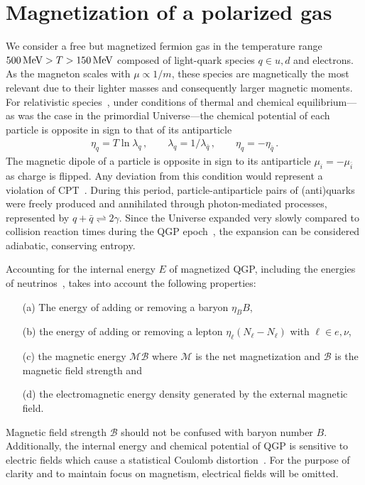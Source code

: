 \documentclass[epjST]{svjour}
\newcommand*{\MeV}{\text{\,MeV}}
\numberwithin{equation}{section}
\begin{document}
\section{Magnetization of a polarized gas}
\label{sec:magnetization}
We consider a free but magnetized fermion gas in the temperature range \(500\MeV>T>150\MeV\) composed of light-quark species \(q \in {u,d}\) and electrons. As the magneton scales with \(\mu \propto 1/m\), these species are magnetically the most relevant due to their lighter masses and consequently larger magnetic moments. For relativistic species~\cite{Elze:1980er}, under conditions of thermal and chemical equilibrium---as was the case in the primordial Universe---the chemical potential of each particle is opposite in sign to that of its antiparticle
\begin{align}
    \eta_{q}=T\ln\lambda_{q}\,,\qquad
    \lambda_{q}=1/\lambda_{\bar{q}}\,,\qquad
    \eta_{q}=-\eta_{\bar{q}}\,.
\end{align}
The magnetic dipole of a particle is opposite in sign to its antiparticle $\mu_{i}=-\mu_{\bar{i}}$ as charge is flipped. Any deviation from this condition would represent a violation of CPT~\cite{Colladay:1996iz,Bluhm:1997ci,BASE:2016yuo}. During this period, particle-antiparticle pairs of (anti)quarks were freely produced and annihilated through photon-mediated processes, represented by $q+\bar{q}\rightleftharpoons2\gamma$. Since the Universe expanded very slowly compared to collision reaction times during the QGP epoch~\cite{Rafelski:2023emw,Yang:2024ret}, the expansion can be considered adiabatic, conserving entropy.

Accounting for the internal energy $E$ of magnetized QGP, including the energies of neutrinos~\cite{Birrell:2014ona}, takes into account the following properties: 
\begin{itemize}
    \item[(a)] The energy of adding or removing a baryon $\eta_{B}B$,
    \item[(b)] the energy of adding or removing a lepton $\eta_{\ell}(N_{\ell}-N_{\ell})$ with $\ell\in {e,\nu}$, 
    \item[(c)] the magnetic energy $\mathcal{M}\mathcal{B}$ where $\mathcal{M}$ is the net magnetization and $\mathcal{B}$ is the magnetic field strength and
    \item[(d)] the electromagnetic energy density generated by the external magnetic field.
\end{itemize}
Magnetic field strength $\mathcal{B}$ should not be confused with baryon number $B$. Additionally, the internal energy and chemical potential of QGP is sensitive to electric fields which cause a statistical Coulomb distortion~\cite{Sigl:1996dm,Letessier:2002ony}. For the purpose of clarity and to maintain focus on magnetism, electrical fields will be omitted.
\end{document}
